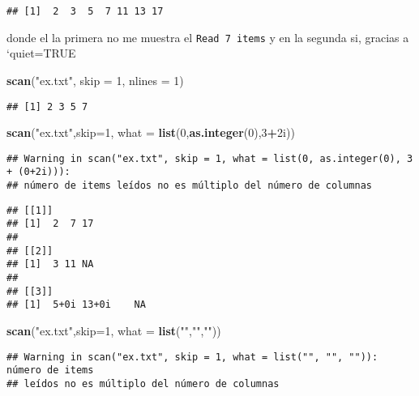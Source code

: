 \documentclass[]{article}
\newenvironment{Shaded}{\begin{snugshade}}{\end{snugshade}}
\newcommand{\KeywordTok}[1]{\textcolor[rgb]{0.13,0.29,0.53}{\textbf{#1}}}
\newcommand{\DataTypeTok}[1]{\textcolor[rgb]{0.13,0.29,0.53}{#1}}
\newcommand{\DecValTok}[1]{\textcolor[rgb]{0.00,0.00,0.81}{#1}}
\newcommand{\StringTok}[1]{\textcolor[rgb]{0.31,0.60,0.02}{#1}}
\newcommand{\OperatorTok}[1]{\textcolor[rgb]{0.81,0.36,0.00}{\textbf{#1}}}
\newcommand{\NormalTok}[1]{#1}
\begin{document}
\begin{verbatim}
## [1]  2  3  5  7 11 13 17
\end{verbatim}

donde el la primera no me muestra el \texttt{Read\ 7\ items} y en la
segunda si, gracias a `quiet=TRUE

\begin{Shaded}
\begin{Highlighting}[]
\KeywordTok{scan}\NormalTok{(}\StringTok{"ex.txt"}\NormalTok{, }\DataTypeTok{skip =} \DecValTok{1}\NormalTok{, }\DataTypeTok{nlines =} \DecValTok{1}\NormalTok{) }
\end{Highlighting}
\end{Shaded}

\begin{verbatim}
## [1] 2 3 5 7
\end{verbatim}

\begin{Shaded}
\begin{Highlighting}[]
\KeywordTok{scan}\NormalTok{(}\StringTok{"ex.txt"}\NormalTok{,}\DataTypeTok{skip=}\DecValTok{1}\NormalTok{, }\DataTypeTok{what =} \KeywordTok{list}\NormalTok{(}\DecValTok{0}\NormalTok{,}\KeywordTok{as.integer}\NormalTok{(}\DecValTok{0}\NormalTok{),}\DecValTok{3}\OperatorTok{+}\NormalTok{2i))}
\end{Highlighting}
\end{Shaded}

\begin{verbatim}
## Warning in scan("ex.txt", skip = 1, what = list(0, as.integer(0), 3 + (0+2i))):
## número de items leídos no es múltiplo del número de columnas
\end{verbatim}

\begin{verbatim}
## [[1]]
## [1]  2  7 17
## 
## [[2]]
## [1]  3 11 NA
## 
## [[3]]
## [1]  5+0i 13+0i    NA
\end{verbatim}

\begin{Shaded}
\begin{Highlighting}[]
\KeywordTok{scan}\NormalTok{(}\StringTok{"ex.txt"}\NormalTok{,}\DataTypeTok{skip=}\DecValTok{1}\NormalTok{, }\DataTypeTok{what =} \KeywordTok{list}\NormalTok{(}\StringTok{""}\NormalTok{,}\StringTok{""}\NormalTok{,}\StringTok{""}\NormalTok{))}
\end{Highlighting}
\end{Shaded}

\begin{verbatim}
## Warning in scan("ex.txt", skip = 1, what = list("", "", "")): número de items
## leídos no es múltiplo del número de columnas
\end{verbatim}
\end{document}
